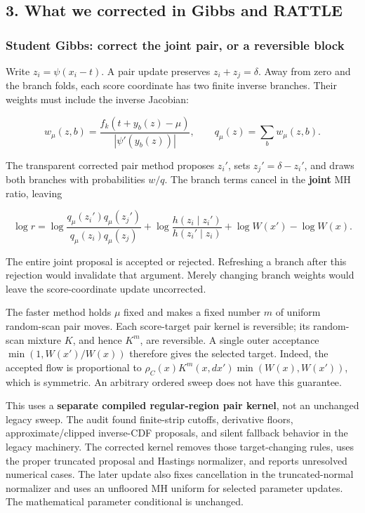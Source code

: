\documentclass[
  10pt,
]{article}
\begin{document}
\subsection{3. What we corrected in Gibbs and
RATTLE}\label{what-we-corrected-in-gibbs-and-rattle}

\subsubsection{Student Gibbs: correct the joint pair, or a reversible
block}\label{student-gibbs-correct-the-joint-pair-or-a-reversible-block}

Write \(z_i=\psi(x_i-t)\). A pair update preserves \(z_i+z_j=\delta\).
Away from zero and the branch folds, each score coordinate has two
finite inverse branches. Their weights must include the inverse
Jacobian:

\[
w_\mu(z,b)=\frac{f_k(t+y_b(z)-\mu)}{|\psi'(y_b(z))|},\qquad
q_\mu(z)=\sum_b w_\mu(z,b).
\]

The transparent corrected pair method proposes \(z_i'\), sets
\(z_j'=\delta-z_i'\), and draws both branches with probabilities
\(w/q\). The branch terms cancel in the \textbf{joint} MH ratio, leaving

\[
\log r=\log\frac{q_\mu(z_i')q_\mu(z_j')}{q_\mu(z_i)q_\mu(z_j)}
+\log\frac{h(z_i\mid z_i')}{h(z_i'\mid z_i)}
+\log W(x')-\log W(x).
\]

The entire joint proposal is accepted or rejected. Refreshing a branch
after this rejection would invalidate that argument. Merely changing
branch weights would leave the score-coordinate update uncorrected.

The faster method holds \(\mu\) fixed and makes a fixed number \(m\) of
uniform random-scan pair moves. Each score-target pair kernel is
reversible; its random-scan mixture \(K\), and hence \(K^m\), are
reversible. A single outer acceptance \(\min(1,W(x')/W(x))\) therefore
gives the selected target. Indeed, the accepted flow is proportional to
\(\rho_C(x)K^m(x,dx')\min(W(x),W(x'))\), which is symmetric. An
arbitrary ordered sweep does not have this guarantee.

This uses a \textbf{separate compiled regular-region pair kernel}, not
an unchanged legacy sweep. The audit found finite-strip cutoffs,
derivative floors, approximate/clipped inverse-CDF proposals, and silent
fallback behavior in the legacy machinery. The corrected kernel removes
those target-changing rules, uses the proper truncated proposal and
Hastings normalizer, and reports unresolved numerical cases. The later
update also fixes cancellation in the truncated-normal normalizer and
uses an unfloored MH uniform for selected parameter updates. The
mathematical parameter conditional is unchanged.
\end{document}
